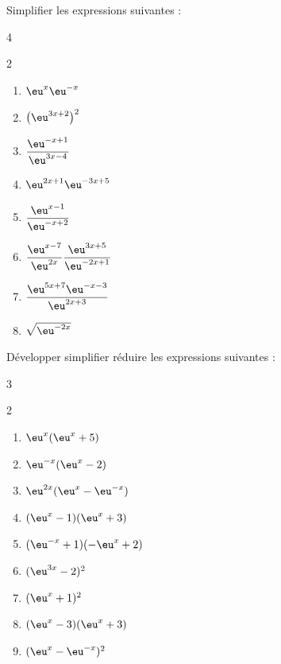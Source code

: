 \documentclass[main.tex]{subfiles}
\begin{document}
\begin{exercise} \label{chapter06:exercice:exponential02}	Simplifier les expressions suivantes :\vspace{-0.5em}
\begin{multicols}{4}
\begin{spacing}{2}
	\begin{enumerate}[leftmargin=*,label={$E_\arabic*(x)=$}]
\item $\eu^{x}\eu^{-x}$ 
\item $ \big(\eu^{3x+2}\big)^2$
\item $\dfrac{\eu^{-x+1}}{\eu^{3x-4}}$ 
\item $\eu^{2x+1}\eu^{-3x+5}$  
\item $\dfrac{\eu^{x-1}}{\eu^{-x+2}} $ 
\item $\dfrac{\eu^{x-7}}{\eu^{2x}}\dfrac{\eu^{3x+5}}{\eu^{-2x+1}}$ 
\item $\dfrac{\eu^{5x+7}\eu^{-x-3}}{\eu^{2x+3}}$  
\item $\sqrt{\eu^{-2x}}$ 
			\end{enumerate}
		\end{spacing}
	\end{multicols} \vspace{-0.5em}
\end{exercise}
\begin{exercise}  \label{chapter06:exercice:exponential03}	Développer simplifier réduire les expressions suivantes  :\vspace{-0.5em}
	\begin{multicols}{3}
		\begin{spacing}{2}
			\begin{enumerate}[leftmargin=*,label={$E_\arabic*(x)=$}]
				\item $\eu^{x}(\eu^x+5)$  
				\item $\eu^{-x}(\eu^x-2)$ 
				\item $\eu^{2x}(\eu^x-\eu^{-x})$   
				\item $(\eu^{x}-1)(\eu^x+3)$ 
				\item $(\eu^{-x}+1)(-\eu^x+2)$ 
				\item $(\eu^{3x}-2)^2$ 
				\item $(\eu^x+1)^2$ 
				\item $(\eu^x-3)(\eu^x+3)$ 
				\item $(\eu^x-\eu^{-x})^2$ 
			\end{enumerate}
		\end{spacing}
	\end{multicols} \vspace{-0.5em}
\end{exercise}
\end{document}
